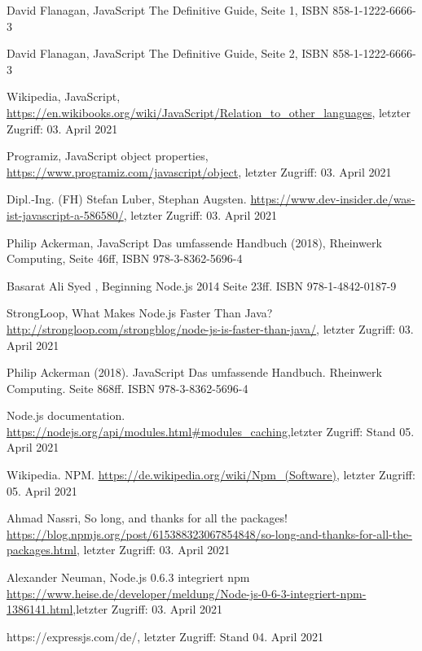 \documentclass[11pt,a4paper]{article}
\begin{document}
\begin{itemize}
 David Flanagan, JavaScript The Definitive Guide,  Seite 1, ISBN 858-1-1222-6666-3

 David Flanagan, JavaScript The Definitive Guide,  Seite 2, ISBN 858-1-1222-6666-3

 Wikipedia, JavaScript, \url{https://en.wikibooks.org/wiki/JavaScript/Relation_to_other_languages}, letzter Zugriff: 03. April 2021

 Programiz, JavaScript object properties, \url{https://www.programiz.com/javascript/object}, letzter Zugriff: 03. April 2021

 Dipl.-Ing. (FH) Stefan Luber, Stephan Augsten. \url{https://www.dev-insider.de/was-ist-javascript-a-586580/}, letzter Zugriff: 03. April 2021

 Philip Ackerman, JavaScript Das umfassende Handbuch (2018), Rheinwerk Computing, Seite 46ff, ISBN 978-3-8362-5696-4

%
%
%
%



 Basarat Ali Syed , Beginning Node.js 2014 Seite 23ff. ISBN 978-1-4842-0187-9

 StrongLoop, What Makes Node.js Faster Than Java? \url{http://strongloop.com/strongblog/node-js-is-faster-than-java/}, letzter Zugriff: 03. April 2021

 Philip Ackerman (2018). JavaScript Das umfassende Handbuch. Rheinwerk Computing. Seite 868ff. ISBN 978-3-8362-5696-4

 Node.js documentation. \url{https://nodejs.org/api/modules.html#modules_caching},letzter Zugriff: Stand 05. April 2021

 Wikipedia. NPM. \url{https://de.wikipedia.org/wiki/Npm_(Software)}, letzter Zugriff: 05. April 2021

 Ahmad Nassri, So long, and thanks for all the packages! \url{https://blog.npmjs.org/post/615388323067854848/so-long-and-thanks-for-all-the-packages.html}, letzter Zugriff: 03. April 2021

 Alexander Neuman, Node.js 0.6.3 integriert npm
\url{https://www.heise.de/developer/meldung/Node-js-0-6-3-integriert-npm-1386141.html},letzter Zugriff: 03. April 2021

 https://expressjs.com/de/, letzter Zugriff: Stand 04. April 2021


\end{itemize}
\end{document}
